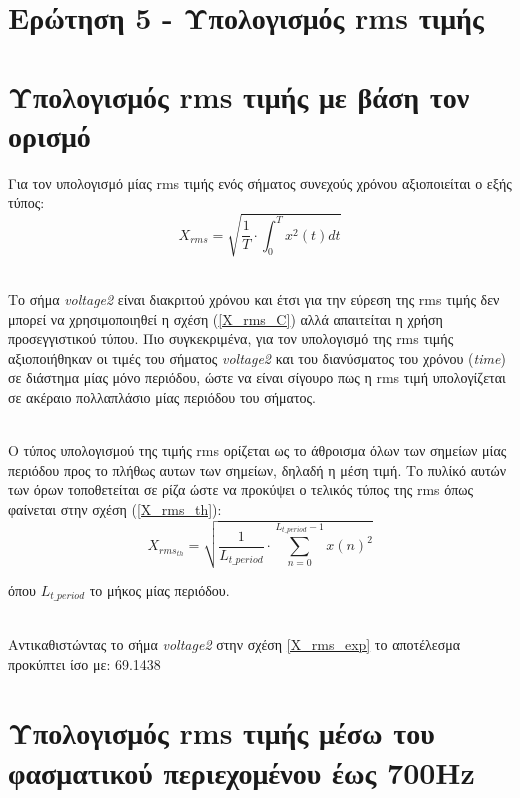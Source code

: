 \section*{Ερώτηση 5 - Υπολογισμός rms τιμής}
\label{ex5}

\section*{Υπολογισμός rms τιμής με βάση τον ορισμό}
\label{ex5q1}


Για τον υπολογισμό μίας rms τιμής ενός σήματος συνεχούς χρόνου αξιοποιείται ο εξής τύπος:
\begin{equation}
    X_{rms} = \sqrt{\frac{1}{T} \cdot \int_0^T x^2(t) dt} \label{X_rms_C}
\end{equation}

\noindent\\
Tο σήμα \textit{voltage2} είναι διακριτού χρόνου και έτσι για την εύρεση της rms τιμής δεν μπορεί να χρησιμοποιηθεί η σχέση (\ref{X_rms_C}) αλλά απαιτείται η χρήση προσεγγιστικού τύπου. Πιο συγκεκριμένα, για τον υπολογισμό της rms τιμής αξιοποιήθηκαν οι τιμές του σήματος \textit{voltage2} και του διανύσματος του χρόνου (\textit{time}) σε διάστημα μίας μόνο περιόδου, ώστε να είναι σίγουρο πως η rms τιμή υπολογίζεται σε ακέραιο πολλαπλάσιο μίας περιόδου του σήματος. 

\noindent\\
Ο τύπος υπολογισμού της τιμής rms ορίζεται ως το άθροισμα όλων των σημείων μίας περιόδου προς το πλήθως αυτων των σημείων, δηλαδή η μέση τιμή. Το  πυλίκό αυτών των όρων τοποθετείται σε ρίζα ώστε να προκύψει ο τελικός τύπος της rms όπως φαίνεται στην σχέση (\ref{X_rms_th}):
\begin{equation}
    X_{rms_{th}} = \sqrt{\frac{1}{L_{t\_period}} \cdot \sum_{n=0}^{L_{t\_period} - 1} x(n)^2} \label{X_rms_th}
\end{equation}

όπου $L_{t\_period}$ το μήκος μίας περιόδου.

\noindent\\
Αντικαθιστώντας το σήμα \textit{voltage2} στην σχέση \ref{X_rms_exp} το αποτέλεσμα προκύπτει ίσο με: 69.1438

\section*{Υπολογισμός rms τιμής μέσω του φασματικού περιεχομένου έως 700Hz}
\label{ex5q2}

